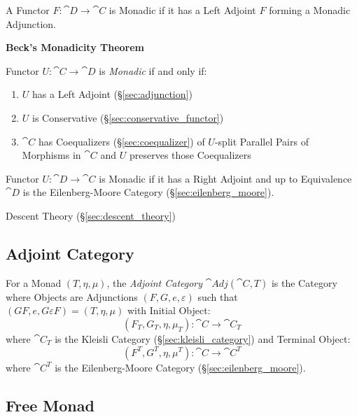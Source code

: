 A Functor $F : \cat{D} \rightarrow \cat{C}$ is Monadic if it has
a Left Adjoint $F$ forming a Monadic Adjunction.

\textbf{Beck's Monadicity Theorem}

Functor $U : \cat{C} \rightarrow \cat{D}$ is \emph{Monadic} if
and only if:
\begin{enumerate}
  \item $U$ has a Left Adjoint (\S\ref{sec:adjunction})
  \item $U$ is Conservative (\S\ref{sec:conservative_functor})
  \item $\cat{C}$ has Coequalizers (\S\ref{sec:coequalizer}) of
    $U$-split Parallel Pairs of Morphisms in $\cat{C}$ and $U$
    preserves those Coequalizers
\end{enumerate}

Functor $U : \cat{D} \rightarrow \cat{C}$ is Monadic if it has a
Right Adjoint and up to Equivalence $\cat{D}$ is the
Eilenberg-Moore Category (\S\ref{sec:eilenberg_moore}).
\cite{lambek-scott88}

Descent Theory (\S\ref{sec:descent_theory})



\subsection{Adjoint Category}\label{sec:adjoint_category}

For a Monad $(T,\eta,\mu)$, the \emph{Adjoint Category}
$\cat{Adj}(\cat{C}, T)$ is the Category where Objects are
Adjunctions $(F,G,e,\varepsilon)$ such that $(GF,e,G \varepsilon F) =
(T,\eta,\mu)$ with Initial Object:
\[
  (F_T, G_T, \eta, \mu_T) : \cat{C} \rightarrow \cat{C}_T
\]
where $\cat{C}_T$ is the Kleisli Category
(\S\ref{sec:kleisli_category}) and Terminal Object:
\[
  (F^T, G^T, \eta, \mu^T) : \cat{C} \rightarrow \cat{C}^T
\]
where $\cat{C}^T$ is the Eilenberg-Moore Category
(\S\ref{sec:eilenberg_moore}).



\subsection{Free Monad}\label{sec:free_monad}


